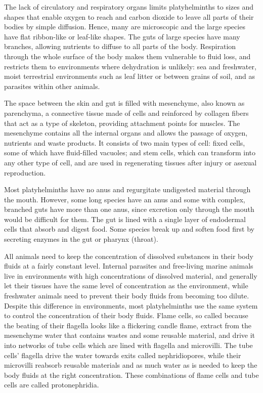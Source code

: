 The lack of circulatory and respiratory organs limits platyhelminths to sizes and shapes that enable oxygen to reach and carbon dioxide to leave all parts of their bodies by simple diffusion. Hence, many are microscopic and the large species have flat ribbon-like or leaf-like shapes. The guts of large species have many branches, allowing nutrients to diffuse to all parts of the body. Respiration through the whole surface of the body makes them vulnerable to fluid loss, and restricts them to environments where dehydration is unlikely: sea and freshwater, moist terrestrial environments such as leaf litter or between grains of soil, and as parasites within other animals.

The space between the skin and gut is filled with mesenchyme, also known as parenchyma, a connective tissue made of cells and reinforced by collagen fibers that act as a type of skeleton, providing attachment points for muscles. The mesenchyme contains all the internal organs and allows the passage of oxygen, nutrients and waste products. It consists of two main types of cell: fixed cells, some of which have fluid-filled vacuoles; and stem cells, which can transform into any other type of cell, and are used in regenerating tissues after injury or asexual reproduction.

Most platyhelminths have no anus and regurgitate undigested material through the mouth. However, some long species have an anus and some with complex, branched guts have more than one anus, since excretion only through the mouth would be difficult for them. The gut is lined with a single layer of endodermal cells that absorb and digest food. Some species break up and soften food first by secreting enzymes in the gut or pharynx (throat).

All animals need to keep the concentration of dissolved substances in their body fluids at a fairly constant level. Internal parasites and free-living marine animals live in environments with high concentrations of dissolved material, and generally let their tissues have the same level of concentration as the environment, while freshwater animals need to prevent their body fluids from becoming too dilute. Despite this difference in environments, most platyhelminths use the same system to control the concentration of their body fluids. Flame cells, so called because the beating of their flagella looks like a flickering candle flame, extract from the mesenchyme water that contains wastes and some reusable material, and drive it into networks of tube cells which are lined with flagella and microvilli. The tube cells' flagella drive the water towards exits called nephridiopores, while their microvilli reabsorb reusable materials and as much water as is needed to keep the body fluids at the right concentration. These combinations of flame cells and tube cells are called protonephridia.

